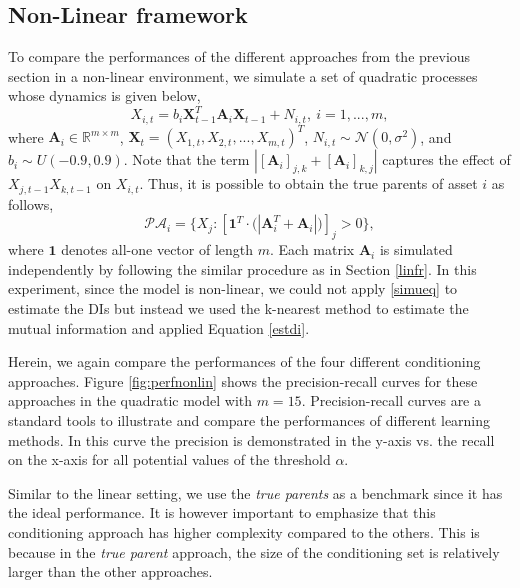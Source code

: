 


\subsection{Non-Linear framework} \label{nonlinfr}
To compare the performances of the different approaches from the previous section in a non-linear environment, we simulate a set of quadratic processes whose dynamics is given below, 
\begin{equation}\label{eq:ex_non}
        X_{i,t} =b_i  {\textbf{X}^T_{t-1}} \textbf{A}_i \textbf{X}_{t-1} + N_{i,t}, \ i=1,...,m,
\end{equation}
where $\textbf{A}_i\in\mathbb{R}^{m \times m}$, $\textbf{X}_t = (X_{1,t}, X_{2,t},..., X_{m,t})^T$, $N_{i,t}\sim\mathcal{N}(0,\sigma^2)$, and $b_i\sim U(-0.9 , 0.9)$.
Note that the term $|[\textbf{A}_i]_{j,k} + [\textbf{A}_i]_{k,j}|$ captures the effect of $X_{j,t-1}X_{k,t-1}$ on $X_{i,t}$. Thus, it is possible to obtain the true parents of asset $i$ as follows,
\begin{equation}
 \mathcal{PA}_i = \{ X_j :  [\textbf{1}^T \cdot \big(|\textbf{A}^T_i + \textbf{A}_i|\big)]_{j}  > 0\},
\end{equation}
where $\textbf{1}$ denotes all-one vector of length $m$.
Each matrix $\textbf{A}_i$ is simulated independently by following the similar procedure as in Section \ref{linfr}.
In this experiment, since the model is non-linear, we could not apply \eqref{simueq} to estimate the DIs but instead we used the k-nearest method to estimate the mutual information and applied Equation \eqref{estdi}.


Herein, we again compare the performances of the four different conditioning approaches. 
Figure \ref{fig:perfnonlin} shows the precision-recall curves for these approaches in the quadratic model with $m=15$. 
Precision-recall curves are a standard tools to illustrate and compare the performances of different learning methods. 
In this curve the precision is demonstrated in the y-axis vs. the recall on the x-axis for all potential values of the threshold $\alpha$. 

Similar to the linear setting, we use the \textit{true parents} as a benchmark since it has the ideal performance. 
It is however important to emphasize that this conditioning approach has higher complexity compared to the others. 
This is because in the \textit{true parent} approach, the size of the conditioning set is relatively larger than the other approaches. 

